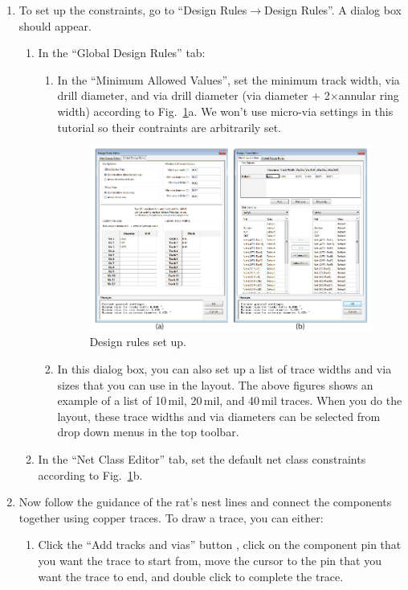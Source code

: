 \documentclass[12pt,letterpaper]{scrartcl}
\begin{document}
\begin{enumerate}
	\item To set up the constraints, go to ``Design Rules$\rightarrow$Design Rules''. A dialog box should appear. 
	\begin{enumerate}
		\item In the ``Global Design Rules'' tab:
			\begin{enumerate}
				\item 	In the ``Minimum Allowed Values'', set the minimum track width, via drill diameter, and via drill diameter (via diameter + 2$\times$annular ring width) according to  Fig.~\ref{fig:design-rules}a. We won't use micro-via settings in this tutorial so their contraints are arbitrarily set.
				\begin{figure}[h]
					\centering
					\includegraphics[width=5.5in]{design-rules}
					\caption{Design rules set up.}
					\label{fig:design-rules}
				\end{figure}
				
				\item In this dialog box, you can also set up a list of trace widths and via sizes that you can use in the layout. The above figures shows an example of a list of 10\,mil, 20\,mil, and 40\,mil traces. When you do the layout, these trace widths and via diameters can be selected from drop down menus in the top toolbar.					
			\end{enumerate}
		\item In the ``Net Class Editor'' tab, set the default net class constraints according to Fig.~\ref{fig:design-rules}b. 	
	\end{enumerate}

	\item Now follow the guidance of the rat's nest lines and connect the components together using copper traces. To draw a trace, you can either:
		\begin{enumerate}
			\item Click the ``Add tracks and vias'' button , click on the component pin that you want the trace to start from, move the cursor to the pin that you want the trace to end, and double click to complete the trace. 
			

\end{enumerate}
\end{enumerate}
\end{document}
